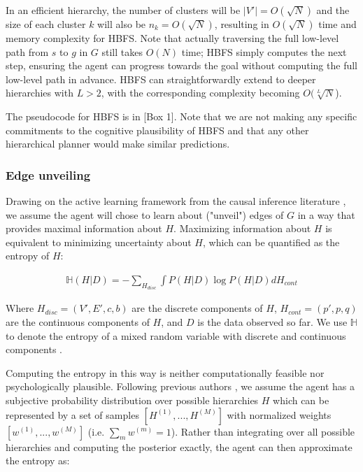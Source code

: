 \documentclass[11pt]{article}
\begin{document}
In an efficient hierarchy, the number of clusters will be $|V'| = O(\sqrt{N})$ and the size of each cluster $k$ will also be $n_k = O(\sqrt{N})$, resulting in $O(\sqrt{N})$ time and memory complexity for HBFS. Note that actually traversing the full low-level path from $s$ to $g$ in $G$ still takes $O(N)$ time; HBFS simply computes the next step, ensuring the agent can progress towards the goal without computing the full low-level path in advance. HBFS can straightforwardly extend to deeper hierarchies with $L > 2$, with the corresponding complexity becoming $O(\sqrt[L]{N}$).

The pseudocode for HBFS is in [Box 1]. Note that we are not making any specific commitments to the cognitive plausibility of HBFS and that any other hierarchical planner would make similar predictions.

\subsubsection{Edge unveiling}

Drawing on the active learning framework from the causal inference literature \cite{murphy2001active, tong2001active}, we assume the agent will chose to learn about ("unveil") edges of $G$ in a way that provides maximal information about $H$. Maximizing information about $H$ is equivalent to minimizing uncertainty about $H$, which can be quantified as the entropy of $H$:

\begin{align}
    \mathbb{H}(H|D) = - \sum_{H_{disc}} \int P(H|D) \log P(H|D) d{H_{cont}}
\end{align}

Where $H_{disc} = (V', E', c, b)$ are the discrete components of $H$, $H_{cont} = (p', p, q)$ are the continuous components of $H$, and $D$ is the data observed so far. We use $\mathbb{H}$ to denote the entropy of a mixed random variable with discrete and continuous components \cite{nair2006entropy}. 

Computing the entropy in this way is neither computationally feasible nor psychologically plausible. Following previous authors \cite{steyvers2003inferring}, we assume the agent has a subjective probability distribution over possible hierarchies $H$ which can be represented by a set of samples $[H^{(1)}, ..., H^{(M)}]$ with normalized weights $[w^{(1)}, ..., w^{(M)}]$ (i.e. $\sum_m w^{(m)} = 1$). Rather than integrating over all possible hierarchies and computing the posterior exactly, the agent can then approximate the entropy as:
\end{document}
